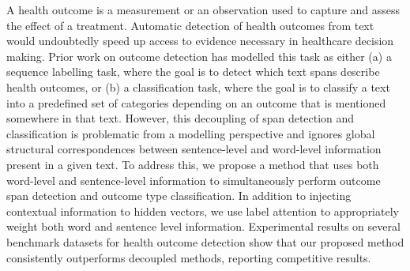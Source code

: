 A health outcome is a measurement or an observation used to capture and assess the effect of a treatment.  Automatic detection of health outcomes from text would undoubtedly speed up access to evidence necessary in healthcare decision making. Prior work on outcome detection has modelled this task as either (a) a sequence labelling task, where the goal is to detect which text spans describe health outcomes, or (b) a classification task, where the goal is to classify a text into a predefined set of categories depending on an outcome that is mentioned somewhere in that text. However, this decoupling of span detection and classification is problematic from a modelling perspective  and  ignores global structural correspondences between sentence-level and word-level information present in a given text. To address this, we propose a method that uses both word-level and sentence-level information to simultaneously perform  outcome  span  detection and outcome type classification. In addition to injecting contextual information to hidden vectors, we use label attention to appropriately weight both word and sentence level information. Experimental results on several benchmark datasets for health outcome detection show that our proposed method consistently outperforms decoupled methods, reporting competitive results.
